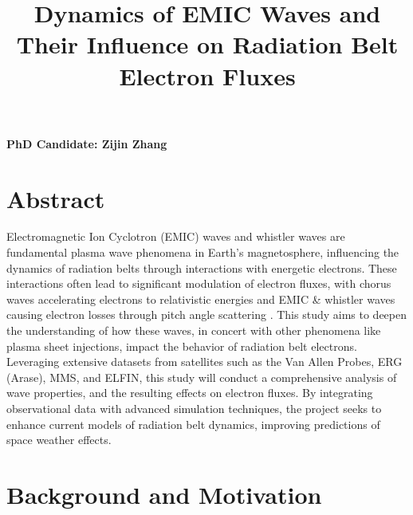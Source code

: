 \documentclass[
  letterpaper,
  DIV=11,
  numbers=noendperiod]{scrartcl}
\title{Dynamics of EMIC Waves and Their Influence on Radiation Belt Electron Fluxes}
\author{}
\date{}
\begin{document}
\maketitle

\vspace{-20truemm}

\textbf{PhD Candidate: Zijin Zhang}

\section{Abstract}\label{abstract}

Electromagnetic Ion Cyclotron (EMIC) waves and whistler waves are fundamental plasma wave phenomena in Earth's magnetosphere, influencing the dynamics of radiation belts through interactions with energetic electrons. These interactions often lead to significant modulation of electron fluxes, with chorus waves accelerating electrons to relativistic energies \citep{miyoshiRebuildingProcessOuter2003, sorathiaModelingDepletionRecovery2018} and EMIC \& whistler waves causing electron losses through pitch angle scattering \citep{summersRelativisticElectronPitchangle2003, summersTimescalesRadiationBelt2007}. This study aims to deepen the understanding of how these waves, in concert with other phenomena like plasma sheet injections, impact the behavior of radiation belt electrons. Leveraging extensive datasets from satellites such as the Van Allen Probes, ERG (Arase), MMS, and ELFIN, this study will conduct a comprehensive analysis of wave properties, and the resulting effects on electron fluxes. By integrating observational data with advanced simulation techniques, the project seeks to enhance current models of radiation belt dynamics, improving predictions of space weather effects.

\section{Background and Motivation}\label{background-and-motivation}
\end{document}
